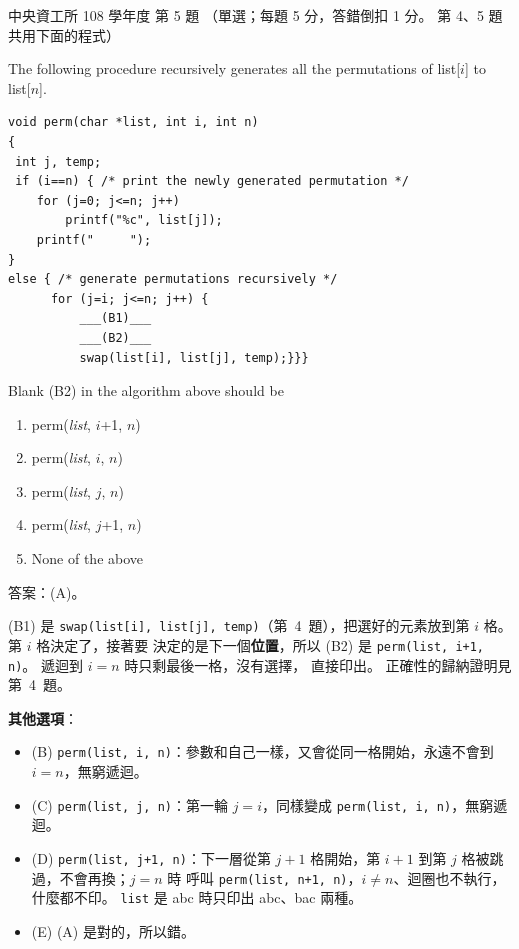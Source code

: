 \begin{pastexam}[label={px:ncu-108-dsa-05}]{中央資工所 108 學年度 第 5 題}
（單選；每題 5 分，答錯倒扣 1 分。 第 4、5 題共用下面的程式）

The following procedure recursively generates all the permutations of list[$i$] to list[$n$].
\begin{verbatim}
void perm(char *list, int i, int n)
{
 int j, temp;
 if (i==n) { /* print the newly generated permutation */
    for (j=0; j<=n; j++)
        printf("%c", list[j]);
    printf("     ");
}
else { /* generate permutations recursively */
      for (j=i; j<=n; j++) {
          ___(B1)___
          ___(B2)___
          swap(list[i], list[j], temp);}}}
\end{verbatim}

Blank (B2) in the algorithm above should be
\begin{enumerate}[label=(\Alph*)]
\item perm(\textit{list}, $i$+1, $n$)
\item perm(\textit{list}, $i$, $n$)
\item perm(\textit{list}, $j$, $n$)
\item perm(\textit{list}, $j$+1, $n$)
\item None of the above
\end{enumerate}
\end{pastexam}

\begin{pastsoln}
答案：(A)。

(B1) 是 \texttt{swap(list[i], list[j], temp)}（第~4~題），把選好的元素放到第 $i$ 格。 第 $i$ 格決定了，接著要
決定的是下一個\textbf{位置}，所以 (B2) 是 \texttt{perm(list, i+1, n)}。 遞迴到 $i = n$ 時只剩最後一格，沒有選擇，
直接印出。 正確性的歸納證明見第~4~題。

\textbf{其他選項}：
\begin{itemize}
\item (B) \texttt{perm(list, i, n)}：參數和自己一樣，又會從同一格開始，永遠不會到 $i = n$，無窮遞迴。
\item (C) \texttt{perm(list, j, n)}：第一輪 $j = i$，同樣變成 \texttt{perm(list, i, n)}，無窮遞迴。
\item (D) \texttt{perm(list, j+1, n)}：下一層從第 $j + 1$ 格開始，第 $i + 1$ 到第 $j$ 格被跳過，不會再換；$j = n$ 時
呼叫 \texttt{perm(list, n+1, n)}，$i \ne n$、迴圈也不執行，什麼都不印。 \texttt{list} 是 abc 時只印出 abc、bac 兩種。
\item (E) (A) 是對的，所以錯。
\end{itemize}
\end{pastsoln}
